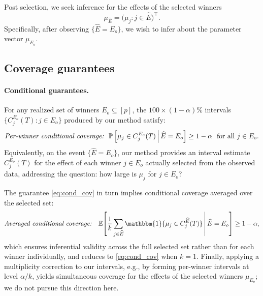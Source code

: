 \documentclass[12pt]{article}
\begin{document}
Post selection, we seek inference for the effects of the selected winners
\begin{equation}
\label{eqn: target:inference}
\mu_{\widehat{E}}= \bigl(\mu_j: j \in\widehat E\bigr)^\top.
\end{equation}
Specifically, after observing $\{\widehat{E}=E_o\}$, we wish to infer about the parameter vector $\mu_{E_o}$.

\subsection{Coverage guarantees}
\label{sec:guarantees}

\paragraph{Conditional guarantees.} For any realized set of winners $E_o\subseteq [p]$, the $100\times(1-\alpha)\%$ intervals $\{C_j^{E_o}(T): j\in E_o\}$ produced by our method satisfy:
\begin{equation}
\label{eq:cond_cov}
 \text{\textit{Per-winner conditional coverage:}}  \ \     \mathbb P
    \left[
        \mu_j\in C_j^{E_o}(T)
        \,\middle|\,
        \widehat E=E_o
    \right]
    \geq 1-\alpha \ \text{ for all } j\in E_o.
\end{equation} 
Equivalently, on the event $\{\widehat E=E_o\}$, our method provides an interval estimate $C_j^{E_o}(T)$ for the effect of each winner $j\in E_o$ actually selected from the observed data, addressing the question: how large is $\mu_j$ for $j\in E_o$?


The guarantee \eqref{eq:cond_cov} in turn implies conditional coverage averaged over the
selected set:
\begin{equation}
\label{eq:cond_cov_avg}
\text{\textit{Averaged conditional coverage:}}\quad
\mathbb{E}\!\left[\frac{1}{k}\sum_{j\in\widehat E}
\mathbbm{1}\{\mu_j\in C_{j}^{\widehat{E}}(T)\}\,\middle|\,\widehat E=E_o\right]
\geq 1-\alpha,
\end{equation}
which ensures inferential validity across the full selected set rather than for each winner individually, and reduces to \eqref{eq:cond_cov} when $k=1$. 
Finally, applying a multiplicity correction to our intervals, e.g., by forming per-winner intervals at level $\alpha/k$, yields simultaneous coverage for the effects of the selected winners $\mu_{E_o}$; we do not pursue this direction here.
\end{document}
